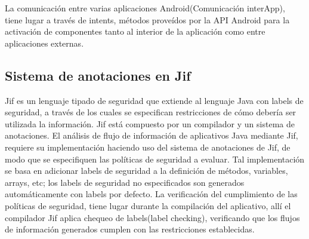 La comunicación entre varias aplicaciones Android(Comunicación interApp), tiene
lugar a través de intents\cite{App-Intent}, métodos proveídos por la API Android
para la activación de componentes tanto al interior de la aplicación como entre
aplicaciones externas. 

\subsection{Sistema de anotaciones en Jif}
Jif es un lenguaje tipado de seguridad que extiende al lenguaje Java con labels
de seguridad, a través de los cuales se especifican restricciones de cómo
debería ser utilizada la información. Jif está compuesto por un compilador y un
sistema de anotaciones.\newline
El análisis de flujo de información de aplicativos Java mediante Jif, requiere
su implementación haciendo uso del sistema de anotaciones de Jif, de modo que se
especifiquen las políticas de seguridad a evaluar.
Tal implementación se basa en adicionar labels de seguridad a la definición
de métodos, variables, arrays, etc; los labels de seguridad no especificados son
generados automáticamente con labels por defecto.\newline
La verificación del cumplimiento de las políticas de seguridad, tiene lugar
durante la compilación del aplicativo, allí el compilador Jif aplica chequeo de
labels(label checking)\cite{jifRef},  verificando que los flujos de información
generados cumplen con las restricciones establecidas. 

